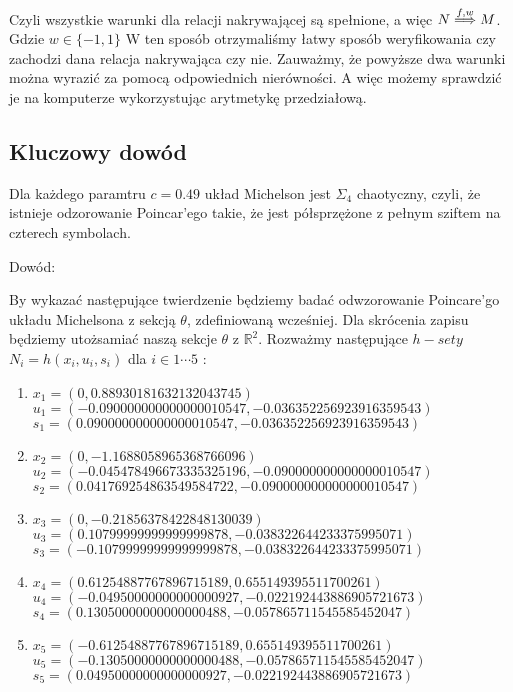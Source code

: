 Czyli wszystkie warunki dla relacji nakrywającej są spełnione, a więc $N \stackrel{f,w}{\Longrightarrow} M $. Gdzie $ w \in \{-1,1\} $ 
W ten sposób otrzymaliśmy łatwy sposób weryfikowania czy zachodzi dana relacja nakrywająca czy nie. Zauważmy, że powyższe dwa 
warunki można wyrazić za pomocą odpowiednich nierówności. A więc możemy sprawdzić je na komputerze wykorzystując arytmetykę przedziałową.

\subsection{Kluczowy dowód}

\begin{theorem}
  Dla każdego paramtru $ c = 0.49 $ układ Michelson jest $ \Sigma_4 $ chaotyczny,
  czyli, że istnieje odzorowanie Poincar'ego takie, że jest półsprzężone z pełnym sziftem na czterech symbolach.
\end{theorem}

Dowód:

By wykazać następujące twierdzenie będziemy badać odwzorowanie Poincare'go układu Michelsona z sekcją $ \theta $, zdefiniowaną wcześniej.
Dla skrócenia zapisu będziemy utożsamiać naszą sekcje $ \theta $ z $ \mathbb R^2 $.
Rozważmy następujące $ h-sety $ $ N_i = h(x_i,u_i,s_i) $ dla $ i \in 1 \cdots 5 $ :

\begin{enumerate}
\item $ x_1 = (0,0.88930181632132043745) $ $ u_1 = (-0.090000000000000010547,-0.036352256923916359543) $ $ s_1 = (0.090000000000000010547,-0.036352256923916359543) $ 
\item $ x_2 = (0,-1.1688058965368766096) $ $ u_2 = (-0.045478496673335325196,-0.090000000000000010547) $ $ s_2 = (0.041769254863549584722,-0.090000000000000010547) $ 
\item $ x_3 = (0,-0.21856378422848130039) $ $ u_3 = (0.10799999999999999878,-0.038322644233375995071) $ $ s_3 = (-0.10799999999999999878,-0.038322644233375995071) $ 
\item $ x_4 = (0.61254887767896715189,0.655149395511700261) $ $ u_4 = (-0.04950000000000000927,-0.022192443886905721673) $ $ s_4 = (0.13050000000000000488,-0.057865711545585452047) $ 
\item $ x_5 = (-0.61254887767896715189,0.655149395511700261) $ $ u_5 = (-0.13050000000000000488,-0.057865711545585452047) $ $ s_5 = (0.04950000000000000927,-0.022192443886905721673) $ 
\end{enumerate}

